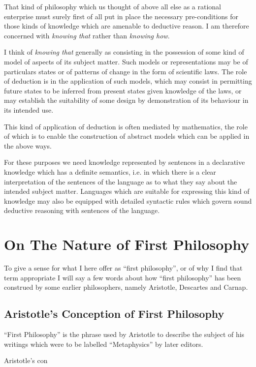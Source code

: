 \documentclass[10pt,titlepage]{book}
\begin{document}
That kind of philosophy which us thought of above all else as a rational enterprise must surely first of all put in place the necessary pre-conditions for those kinds of knowledge which are amenable to deductive reason.
I am therefore concerned with \emph{knowing that} rather than \emph{knowing how}.

I think of \emph{knowing that} generally as consisting in the possession of some kind of model of aspects of its subject matter.
Such models or representations may be of particulars states or of patterns of change  in the form of scientific laws. 
The role of deduction is in the application of such models, which may consist in permitting future states to be inferred from present states given knowledge of the laws, or may establish the suitability of some design by demonstration of its behaviour in its intended use.

This kind of application of deduction is often mediated by mathematics, the role of which is to enable the construction of abstract models which can be applied in the above ways.

For these purposes we need knowledge represented by sentences in a declarative knowledge which has a definite semantics, i.e. in which there is a clear interpretation of the sentences of the language as to what they say about the intended subject matter.
Languages which are suitable for expressing this kind of knowledge may also be equipped with detailed syntactic rules which govern sound deductive reasoning with sentences of the language.

\section{On The Nature of First Philosophy}

To give a sense for what I here offer as ``first philosophy'', or of why I find that term appropriate I will say a few words about how ``first philosophy'' has been construed by some earlier philosophers, namely Aristotle, Descartes and Carnap.

\subsection{Aristotle's Conception of First Philosophy}

``First Philosophy'' is the phrase used by Aristotle to describe the subject of his writings which were to be labelled ``Metaphysics'' by later editors.

Aristotle's con
\end{document}
